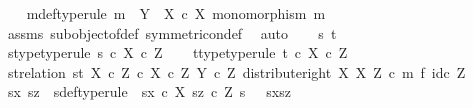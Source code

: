 \begin{isabellebody}
\isamarkupfalse%
\isanewline
\ \ \isamarkupfalse%
\ m{\isacharunderscore}{\kern0pt}def{\isacharbrackleft}{\kern0pt}type{\isacharunderscore}{\kern0pt}rule{\isacharbrackright}{\kern0pt}{\isacharcolon}{\kern0pt}\ {\isachardoublequoteopen}m\ {\isacharcolon}{\kern0pt}\ Y\ {\isasymrightarrow}\ X\ {\isasymtimes}\isactrlsub c\ X{\isachardoublequoteclose}\ {\isachardoublequoteopen}monomorphism\ m{\isachardoublequoteclose}\isanewline
\ \ \ \ \isamarkupfalse%
\ assms\ subobject{\isacharunderscore}{\kern0pt}of{\isacharunderscore}{\kern0pt}def{}\ symmetric{\isacharunderscore}{\kern0pt}on{\isacharunderscore}{\kern0pt}def\ \isamarkupfalse%
\ auto\isanewline
\ \ \isamarkupfalse%
\ s\ t\ \isanewline
\ \ \isamarkupfalse%
\ s{\isacharunderscore}{\kern0pt}type{\isacharbrackleft}{\kern0pt}type{\isacharunderscore}{\kern0pt}rule{\isacharbrackright}{\kern0pt}{\isacharcolon}{\kern0pt}\ {\isachardoublequoteopen}s\ {\isasymin}\isactrlsub c\ X\ {\isasymtimes}\isactrlsub c\ Z{\isachardoublequoteclose}\isanewline
\ \ \isamarkupfalse%
\ t{\isacharunderscore}{\kern0pt}type{\isacharbrackleft}{\kern0pt}type{\isacharunderscore}{\kern0pt}rule{\isacharbrackright}{\kern0pt}{\isacharcolon}{\kern0pt}\ {\isachardoublequoteopen}t\ {\isasymin}\isactrlsub c\ X\ {\isasymtimes}\isactrlsub c\ Z{\isachardoublequoteclose}\isanewline
\ \ \isamarkupfalse%
\ st{\isacharunderscore}{\kern0pt}relation{\isacharcolon}{\kern0pt}\ {\isachardoublequoteopen}{\isasymlangle}s{\isacharcomma}{\kern0pt}t{\isasymrangle}\ {\isasymin}\isactrlbsub {\isacharparenleft}{\kern0pt}X\ {\isasymtimes}\isactrlsub c\ Z{\isacharparenright}{\kern0pt}\ {\isasymtimes}\isactrlsub c\ X\ {\isasymtimes}\isactrlsub c\ Z\isactrlesub \ {\isacharparenleft}{\kern0pt}Y\ {\isasymtimes}\isactrlsub c\ Z{\isacharcomma}{\kern0pt}\ distribute{\isacharunderscore}{\kern0pt}right\ X\ X\ Z\ {\isasymcirc}\isactrlsub c\ m\ {\isasymtimes}\isactrlsub f\ id\isactrlsub c\ Z{\isacharparenright}{\kern0pt}{\isachardoublequoteclose}\isanewline
\ \ \isanewline
\ \ \isamarkupfalse%
\ sx\ sz\ \ s{\isacharunderscore}{\kern0pt}def{\isacharbrackleft}{\kern0pt}type{\isacharunderscore}{\kern0pt}rule{\isacharbrackright}{\kern0pt}{\isacharcolon}{\kern0pt}\ {\isachardoublequoteopen}\ sx\ {\isasymin}\isactrlsub c\ X{\isachardoublequoteclose}\ {\isachardoublequoteopen}sz\ {\isasymin}\isactrlsub c\ Z{\isachardoublequoteclose}\ {\isachardoublequoteopen}s\ {\isacharequal}{\kern0pt}\ \ {\isasymlangle}sx{\isacharcomma}{\kern0pt}sz{\isasymrangle}{\isachardoublequoteclose}\isanewline

\end{isabellebody}
